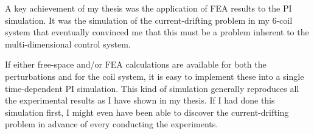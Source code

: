 A key achievement of my thesis was the application of FEA results to the PI simulation. It was the simulation of the current-drifting problem in my 6-coil system that eventually convinced me that this must be a problem inherent to the multi-dimensional control system. 

If either free-space and/or FEA calculations are available for both the perturbations and for the coil system, it is easy to implement these into a single time-dependent PI simulation. This kind of simulation generally reproduces all the experimental results as I have shown in my thesis. If I had done this simulation first, I might even have been able to discover the current-drifting problem in advance of every conducting the experiments.




